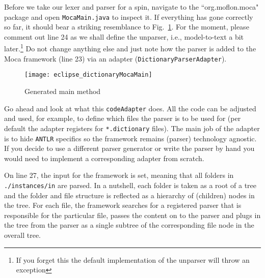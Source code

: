 Before we take our lexer and parser for a spin, navigate to the ``org.moflon.moca" package and open \texttt{MocaMain.java} to inspect it. If everything has gone
correctly so far, it should bear a striking resemblance to Fig.~\ref{eclipse:mocaMain}. For the moment, please comment out line 24  as we shall define the
unparser, i.e., model-to-text a bit later.\footnote{If you forget this the default implementation of the unparser will throw an exception} Do not change
anything else and just note how the parser is added to the Moca framework (line 23) via an adapter (\texttt{Dictionary\-Parser\-Adapter}).
 
\begin{figure}[htp]
\begin{center}
 \texttt{[image: eclipse\_dictionaryMocaMain]}
  \caption{Generated main method}
  \label{eclipse:mocaMain} 
\end{center}
\end{figure}

Go ahead and look at what this \texttt{codeAdapter} does. All the code can be adjusted and used, for example, to define which files the parser is
to be used for (per default the adapter registers for \texttt{*.dictionary} files). The main job of the adapter is to hide \texttt{ANTLR} specifics so the
framework remains (parser) technology agnostic. If you decide to use a different parser generator or write the parser by hand you would need to implement a
corresponding adapter from scratch.

On line 27, the input for the framework is set, meaning that all folders in \texttt{./instances/in} are parsed.
In a nutshell, each folder is taken as a root of a tree and the folder and file structure is reflected as a hierarchy of (children) nodes in the tree.
For each file, the framework searches for a registered parser that is responsible for the particular file, passes the content on to the parser and plugs in the
tree from the parser as a single subtree of the corresponding file node in the overall tree.  

\newpage

